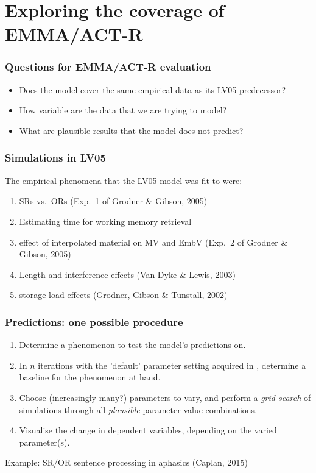 \documentclass{beamer}
\begin{document}
\section{Exploring the coverage of EMMA/ACT-R}

\begin{frame}
  \frametitle{Questions for EMMA/ACT-R evaluation}

  \begin{itemize}
    \item Does the model cover the same empirical data as its LV05 predecessor?
    \item How variable are the data that we are trying to model?
    \item What are plausible results that the model does not predict?
  \end{itemize}

\end{frame}

\begin{frame}
  \frametitle{Simulations in LV05}

The empirical phenomena that the LV05 model was fit to were:

  \begin{enumerate}
    \item SRs vs.\ ORs (Exp.\ 1 of Grodner \& Gibson, 2005)
    \item Estimating time for working memory retrieval
    \item effect of interpolated material on MV and EmbV (Exp.\ 2 of Grodner \& Gibson, 2005)
    \item Length and interference effects (Van Dyke \& Lewis, 2003)
    \item storage load effects (Grodner, Gibson \& Tunstall, 2002)
  \end{enumerate}
\end{frame}

\begin{frame}
  \frametitle{Predictions: one possible procedure}

  \begin{enumerate}
    \item Determine a phenomenon to test the model's predictions on.
    \item In $n$ iterations with the 'default' parameter setting acquired in \cite{Engelmann2013}, determine a
      baseline for the phenomenon at hand.
    \item Choose (increasingly many?) parameters to vary, and perform a \emph{grid search} of simulations through all
      \emph{plausible} parameter value combinations.
    \item Visualise the change in dependent variables, depending on the varied parameter(s).
  \end{enumerate}

  Example: SR/OR sentence processing in aphasics (Caplan, 2015)

\end{frame}
\end{document}
